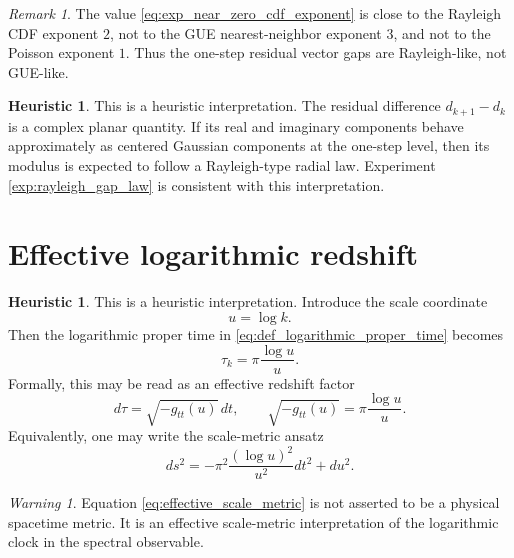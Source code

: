 \documentclass[11pt]{amsart}
\numberwithin{equation}{section}
\theoremstyle{plain}
\theoremstyle{definition}
\newtheorem{heuristic}[theorem]{Heuristic}
\theoremstyle{remark}
\newtheorem{remark}[theorem]{Remark}
\newtheorem{warning}[theorem]{Warning}
\begin{document}
\begin{remark}
\label{rem:local_rayleigh_not_gue}
The value \eqref{eq:exp_near_zero_cdf_exponent} is close to the Rayleigh CDF exponent \(2\), not to the GUE nearest-neighbor exponent \(3\), and not to the Poisson exponent \(1\).  Thus the one-step residual vector gaps are Rayleigh-like, not GUE-like.
\end{remark}

\begin{heuristic}
\label{heur:planar_fluctuation}
This is a heuristic interpretation.  The residual difference \(d_{k+1}-d_k\) is a complex planar quantity.  If its real and imaginary components behave approximately as centered Gaussian components at the one-step level, then its modulus is expected to follow a Rayleigh-type radial law.  Experiment \ref{exp:rayleigh_gap_law} is consistent with this interpretation.
\end{heuristic}

\section{Effective logarithmic redshift}
\label{sec:effective_logarithmic_redshift}

\begin{heuristic}
\label{heur:scale_redshift}
This is a heuristic interpretation.  Introduce the scale coordinate
\begin{equation}
u
=
\log k.
\label{eq:scale_coordinate_u}
\end{equation}
Then the logarithmic proper time in \eqref{eq:def_logarithmic_proper_time} becomes
\begin{equation}
\tau_k
=
\pi\frac{\log u}{u}.
\label{eq:proper_time_scale_coordinate}
\end{equation}
Formally, this may be read as an effective redshift factor
\begin{equation}
d\tau
=
\sqrt{-g_{tt}(u)}\,dt,
\qquad
\sqrt{-g_{tt}(u)}
=
\pi\frac{\log u}{u}.
\label{eq:effective_redshift_factor}
\end{equation}
Equivalently, one may write the scale-metric ansatz
\begin{equation}
ds^2
=
-\pi^2\frac{(\log u)^2}{u^2}dt^2+du^2.
\label{eq:effective_scale_metric}
\end{equation}
\end{heuristic}

\begin{warning}
\label{warn:not_physical_metric}
Equation \eqref{eq:effective_scale_metric} is not asserted to be a physical spacetime metric.  It is an effective scale-metric interpretation of the logarithmic clock in the spectral observable.
\end{warning}
\end{document}
